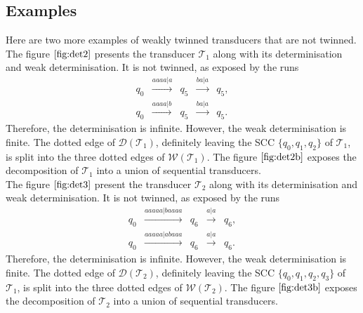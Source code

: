 \documentclass[envcountsame]{llncs}
\newcommand\tra{\mathcal{T}}
\begin{document}
\subsection*{Examples}
Here are two more examples of weakly twinned transducers that are not twinned.\\

The figure $\ref{fig:det2} $ presents the transducer $\tra_1$ along with its determinisation and weak determinisation.
It is not twinned, as exposed by the runs 
$$\begin{array}{lllll}
q_0 & \xrightarrow{aaaa|a} & q_5 & \xrightarrow{ba|a} & q_5,\\
q_0 & \xrightarrow{aaaa|b} & q_5 & \xrightarrow{ba|a} & q_5.
\end{array}$$
Therefore, the determinisation is infinite.
However, the weak determinisation is finite.
The dotted edge of $\mathcal{D}(\tra_1)$, definitely leaving the SCC $\{ q_0,q_1,q_2 \}$ of $\tra_1$, is split into the three dotted edges of $\mathcal{W}(\tra_1)$.
The figure $\ref{fig:det2b}$ exposes the decomposition of $\tra_1$ into a union of sequential transducers.\\ 

The figure $\ref{fig:det3} $ present the transducer $\tra_2$ along with its determinisation and weak determinisation.
It is not twinned, as exposed by the runs 
$$\begin{array}{lllll}
q_0 & \xrightarrow{aaaaa|baaaa} & q_6 & \xrightarrow{a|a} & q_6,\\
q_0 & \xrightarrow{aaaaa|abaaa} & q_6 & \xrightarrow{a|a} & q_6.
\end{array}$$
Therefore, the determinisation is infinite.
However, the weak determinisation is finite.
The dotted edge of $\mathcal{D}(\tra_2)$, definitely leaving the SCC $\{ q_0,q_1,q_2,q_3 \}$ of $\tra_1$, is split into the three dotted edges of $\mathcal{W}(\tra_2)$.
The figure $\ref{fig:det3b}$ exposes the decomposition of $\tra_2$ into a union of sequential transducers.\\ 
\end{document}
